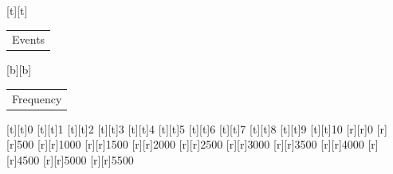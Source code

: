 %    
%
%
\begin{psfrags}%
\psfragscanon%
%
[t][t]{\color[rgb]{0,0,0}\setlength{\tabcolsep}{0pt}\begin{tabular}{c}{\Large Events}\end{tabular}}%
[b][b]{\color[rgb]{0,0,0}\setlength{\tabcolsep}{0pt}\begin{tabular}{c}{\Large Frequency}\end{tabular}}%
%
[t][t]{0}%
[t][t]{1}%
[t][t]{2}%
[t][t]{3}%
[t][t]{4}%
[t][t]{5}%
[t][t]{6}%
[t][t]{7}%
[t][t]{8}%
[t][t]{9}%
[t][t]{10}%
%
[r][r]{0}%
[r][r]{500}%
[r][r]{1000}%
[r][r]{1500}%
[r][r]{2000}%
[r][r]{2500}%
[r][r]{3000}%
[r][r]{3500}%
[r][r]{4000}%
[r][r]{4500}%
[r][r]{5000}%
[r][r]{5500}%
%
%
\end{psfrags}%
%
